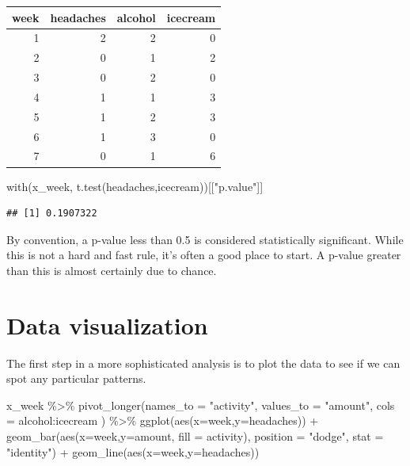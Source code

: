 \documentclass[
]{book}
\newenvironment{Shaded}{\begin{snugshade}}{\end{snugshade}}
\newcommand{\AttributeTok}[1]{\textcolor[rgb]{0.77,0.63,0.00}{#1}}
\newcommand{\FunctionTok}[1]{\textcolor[rgb]{0.00,0.00,0.00}{#1}}
\newcommand{\NormalTok}[1]{#1}
\newcommand{\SpecialCharTok}[1]{\textcolor[rgb]{0.00,0.00,0.00}{#1}}
\newcommand{\StringTok}[1]{\textcolor[rgb]{0.31,0.60,0.02}{#1}}
\begin{document}
\begin{table}
\centering
\begin{tabular}{r|r|r|r}
\hline
week & headaches & alcohol & icecream\\
\hline
1 & 2 & 2 & 0\\
\hline
2 & 0 & 1 & 2\\
\hline
3 & 0 & 2 & 0\\
\hline
4 & 1 & 1 & 3\\
\hline
5 & 1 & 2 & 3\\
\hline
6 & 1 & 3 & 0\\
\hline
7 & 0 & 1 & 6\\
\hline
\end{tabular}
\end{table}

\begin{Shaded}
\begin{Highlighting}[]
\FunctionTok{with}\NormalTok{(x\_week, }\FunctionTok{t.test}\NormalTok{(headaches,icecream))[[}\StringTok{"p.value"}\NormalTok{]]}
\end{Highlighting}
\end{Shaded}

\begin{verbatim}
## [1] 0.1907322
\end{verbatim}

By convention, a p-value less than 0.5 is considered statistically significant. While this is not a hard and fast rule, it's often a good place to start. A p-value greater than this is almost certainly due to chance.

\hypertarget{data-visualization}{%
\section{Data visualization}\label{data-visualization}}

The first step in a more sophisticated analysis is to plot the data to see if we can spot any particular patterns.

\begin{Shaded}
\begin{Highlighting}[]
\NormalTok{x\_week }\SpecialCharTok{\%\textgreater{}\%} \FunctionTok{pivot\_longer}\NormalTok{(}\AttributeTok{names\_to =} \StringTok{"activity"}\NormalTok{,}
                        \AttributeTok{values\_to =} \StringTok{"amount"}\NormalTok{,}
                        \AttributeTok{cols =}\NormalTok{ alcohol}\SpecialCharTok{:}\NormalTok{icecream ) }\SpecialCharTok{\%\textgreater{}\%} 
  \FunctionTok{ggplot}\NormalTok{(}\FunctionTok{aes}\NormalTok{(}\AttributeTok{x=}\NormalTok{week,}\AttributeTok{y=}\NormalTok{headaches)) }\SpecialCharTok{+}
  \FunctionTok{geom\_bar}\NormalTok{(}\FunctionTok{aes}\NormalTok{(}\AttributeTok{x=}\NormalTok{week,}\AttributeTok{y=}\NormalTok{amount, }\AttributeTok{fill =}\NormalTok{ activity),}
           \AttributeTok{position =} \StringTok{"dodge"}\NormalTok{,}
           \AttributeTok{stat =} \StringTok{"identity"}\NormalTok{) }\SpecialCharTok{+}
  \FunctionTok{geom\_line}\NormalTok{(}\FunctionTok{aes}\NormalTok{(}\AttributeTok{x=}\NormalTok{week,}\AttributeTok{y=}\NormalTok{headaches))}
\end{Highlighting}
\end{Shaded}
\end{document}
